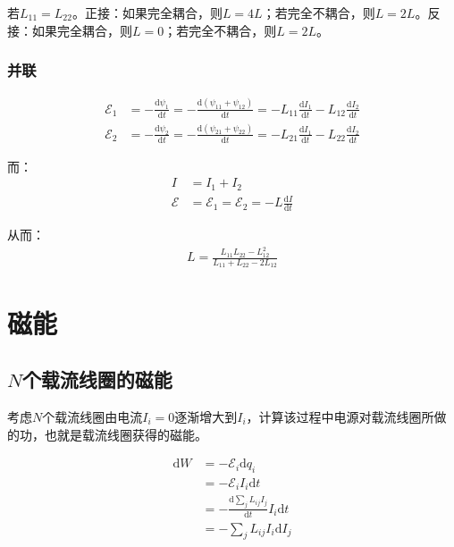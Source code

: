\documentclass[12pt,onecolumn,a4paper]{book}
\numberwithin{table}{subsection}
\numberwithin{equation}{subsection}
\begin{document}
    若$L_{11}=L_{22}$。正接：如果完全耦合，则$L = 4L$；若完全不耦合，则$L = 2L$。反接：如果完全耦合，则$L = 0$；若完全不耦合，则$L = 2L$。

    \subsubsection{并联}

    \begin{align}
        \mathcal{E}_1 & = - \frac{\mathrm{d} \psi_1}{\mathrm{d} t} = - \frac{\mathrm{d} (\psi_{11} + \psi_{12})}{\mathrm{d} t} = - L_{11} \frac{\mathrm{d} I_1}{\mathrm{d} t}- L_{12} \frac{\mathrm{d} I_2}{\mathrm{d} t} \\
        \mathcal{E}_2 & = - \frac{\mathrm{d} \psi_2}{\mathrm{d} t} = - \frac{\mathrm{d} (\psi_{21} + \psi_{22})}{\mathrm{d} t} = - L_{21} \frac{\mathrm{d} I_1}{\mathrm{d} t}- L_{22} \frac{\mathrm{d} I_2}{\mathrm{d} t}
    \end{align}

    而：
    \begin{align}
        I           & = I_1 + I_2                                                            \\
        \mathcal{E} & = \mathcal{E}_1 =\mathcal{E}_2 = - L \frac{\mathrm{d} I}{\mathrm{d} t}
    \end{align}

    从而：
    \begin{align}
        L = \frac{L_{11}L_{22}-L_{12}^2}{L_{11}+L_{22}-2L_{12}}
    \end{align}

    \section{磁能}

    \subsection{$N$个载流线圈的磁能}

    考虑$N$个载流线圈由电流$I_i= 0$逐渐增大到$I_i$，计算该过程中电源对载流线圈所做的功，也就是载流线圈获得的磁能。

    \begin{align}
        \mathrm{d} W & = - \mathcal{E}_i \mathrm{d} q_i                                      \\
                     & = - \mathcal{E}_i I_i \mathrm{d} t                                    \\
                     & = - \frac{\mathrm{d}\sum_j  L_{ij} I_j}{\mathrm{d} t}I_i \mathrm{d} t \\
                     & = -\sum_j L_{ij} I_i\mathrm{d} I_j
    \end{align}
\end{document}
